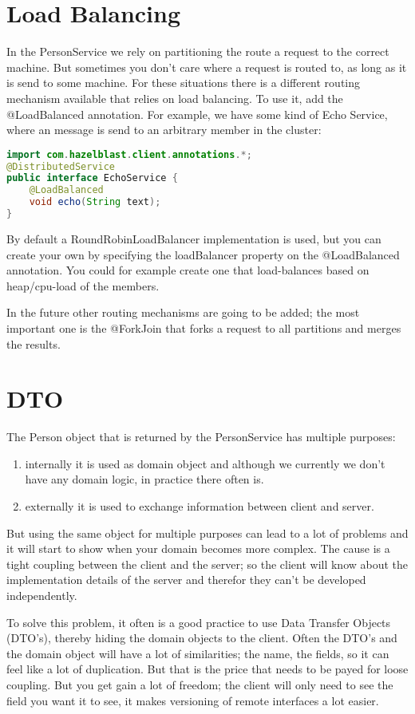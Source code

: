 \section{Load Balancing}
In the PersonService we rely on partitioning the route a request to the correct machine. But sometimes you don't care where a request is routed to, as long as it is send to some machine. For these situations there is a different routing mechanism available that relies on load balancing. To use it, add the @LoadBalanced annotation. For example, we have some kind of Echo Service, where an message is send to an arbitrary member in the cluster:
\begin{lstlisting}[language=java]
import com.hazelblast.client.annotations.*;
@DistributedService
public interface EchoService {
    @LoadBalanced
    void echo(String text);
}
\end{lstlisting}
By default a RoundRobinLoadBalancer implementation is used, but you can create your own by specifying the loadBalancer property on the @LoadBalanced annotation. You could for example create one that load-balances based on heap/cpu-load of the members. 

In the future other routing mechanisms are going to be added; the most important one is the @ForkJoin that forks a request to all partitions and merges the results.

\section{DTO}
The Person object that is returned by the PersonService has multiple purposes:
\begin{enumerate}
\item internally it is used as domain object and although we currently we don't have any domain logic, in practice there often is.
\item externally it is used to exchange information between client and server.
\end{enumerate}
But using the same object for multiple purposes can lead to a lot of problems and it will start to show when your domain becomes more complex. The cause is a tight coupling between the client and the server; so the client will know about the implementation details of the server and therefor they can't be developed independently. 

To solve this problem, it often is a good practice to use Data Transfer Objects (DTO's), thereby hiding the domain objects to the client. Often the DTO's and the domain object will have a lot of similarities; the name, the fields, so it can feel like a lot of duplication. But that is the price that needs to be payed for loose coupling. But you get gain a lot of freedom; the client will only need to see the field you want it to see, it makes versioning of remote interfaces a lot easier. 

